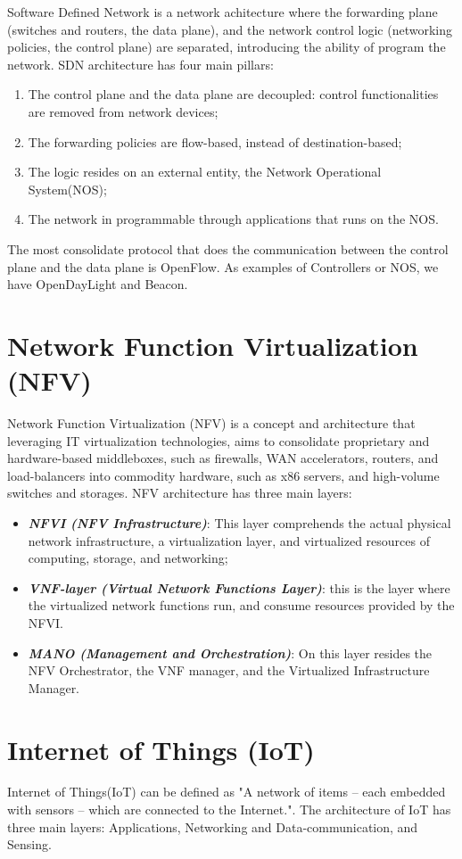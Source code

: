 Software Defined Network\cite{sdn-survey} is a network achitecture where the forwarding plane (switches and routers, the data plane), and the network control logic (networking policies, the control plane) are separated, introducing the ability of program the network.  SDN architecture has four main pillars:
\begin{enumerate}[label=\roman*]
    \item The control plane and the data plane are decoupled: control functionalities are removed from network devices;
    \item The forwarding policies are flow-based, instead of destination-based; 
    \item The logic resides on an external entity, the Network Operational System(\acrshort{NOS});
    \item The network in programmable through applications that runs on the NOS.
\end{enumerate}
The most consolidate protocol that does the communication between the control plane and the data plane is OpenFlow. As examples of Controllers or NOS, we have OpenDayLight and Beacon. 


\section{Network Function Virtualization (NFV)}

Network Function Virtualization (NFV)\cite{nfv-survey} is a concept and architecture that leveraging \acrshort{IT} virtualization technologies, aims to consolidate proprietary and hardware-based middleboxes, such as firewalls, WAN accelerators, routers, and load-balancers into commodity hardware, such as x86 servers, and high-volume switches and storages. NFV architecture has three main layers:
\begin{itemize}
    \item \textit{\textbf{\acrshort{NFVI} (NFV Infrastructure)}}: This layer comprehends the actual physical network infrastructure, a virtualization layer, and virtualized resources of computing, storage, and networking;
    \item \textit{\textbf{VNF-layer (Virtual Network Functions Layer)}}: this is the layer where the virtualized network functions run, and consume resources provided by the NFVI.
    \item \textit{\textbf{\acrshort{MANO} (Management and Orchestration)}}: On this layer resides the NFV Orchestrator, the VNF manager, and the Virtualized Infrastructure Manager. 
\end{itemize}


\section{Internet of Things (IoT)}


Internet of Things(IoT)\cite{iot-ieee} can be defined as "A network of items -- each embedded with sensors -- which are connected to the Internet."\cite{iot-ieee}. The architecture of IoT has three main layers: Applications, Networking and Data-communication, and Sensing. 





